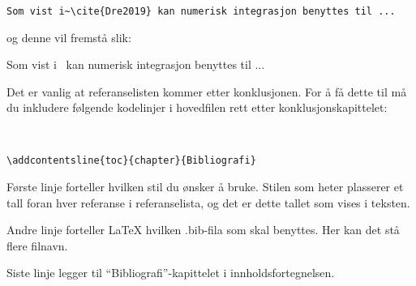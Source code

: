 \begin{boxedminipage}{\textwidth}
\begin{verbatim}
Som vist i~\cite{Dre2019} kan numerisk integrasjon benyttes til ...
\end{verbatim}
\end{boxedminipage}

og denne vil fremstå slik:

Som vist i~\cite{Dre2019} kan numerisk integrasjon benyttes til ...


Det er vanlig at referanselisten kommer etter konklusjonen.
For å få dette til må du inkludere følgende
kodelinjer i hovedfilen rett etter konklusjonskapittelet:

\begin{boxedminipage}{\textwidth}
\begin{verbatim}


\addcontentsline{toc}{chapter}{Bibliografi} 
\end{verbatim}
\end{boxedminipage}

Første linje forteller hvilken stil du ønsker å bruke. 
Stilen som heter  plasserer et tall foran hver
referanse i referanselista, og det er dette tallet som vises i
teksten. 

Andre linje forteller {\LaTeX} hvilken .bib-fila som skal
benyttes. Her kan det stå flere filnavn.

Siste linje legger til ``Bibliografi''-kapittelet i innholdsfortegnelsen.


